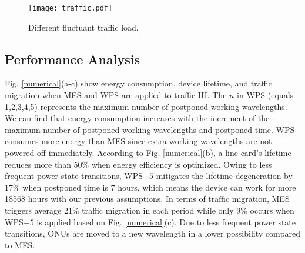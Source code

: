 \documentclass[letter]{IEEEtran}
\begin{document}
\begin{figure}[t]
  \centering 
  \texttt{[image: traffic.pdf]}\\ 
  \caption{ Different fluctuant traffic load.}
  \label{traffic}
  \vspace{-6.0mm}
\end{figure}

\begin{figure*}[h]
	\setlength{\abovecaptionskip}{-1.0mm}
    \centering 
    \caption{Comparison between energy consumption (a), device lifetime (b), and traffic migration (c) with a different number of postponed working wavelengths and postponed periods under traffic-III.} 
    \label{numerical} 
    \vspace{-5.0mm}
\end{figure*}

\begin{figure*}[h]
  \setlength{\abovecaptionskip}{-1.0mm}
    \centering 
    \caption{Trade-off between energy consumption and lifetime degeneration, traffic migration under different traffic fluctuations.} 
    \label{numerical_2} 
    \vspace{-6.0mm}
\end{figure*}

\vspace{-5.0mm}
\subsection{Performance Analysis}
Fig. \ref{numerical}(a-c) show energy consumption, device lifetime, and traffic migration when MES and WPS are applied to traffic-III. The $n$ in WPS (equals 1,2,3,4,5) represents the maximum number of postponed working wavelengths. We can find that energy consumption increases with the increment of the maximum number of postponed working wavelengths and postponed time. WPS consumes more energy than MES since extra working wavelengths are not powered off immediately. According to Fig. \ref{numerical}(b), a line card's lifetime reduces more than 50\% when energy efficiency is optimized. Owing to less frequent power state transitions, WPS$ -5 $ mitigates the lifetime degeneration by 17\% when postponed time is 7 hours, which means the device can work for more 18568 hours with our previous assumptions. In terms of traffic migration, MES triggers average 21\% traffic migration in each period while only 9\% occurs when WPS$ -5 $ is applied based on Fig. \ref{numerical}(c). Due to less frequent power state transitions, ONUs are moved to a new wavelength in a lower possibility compared to MES.
\end{document}
